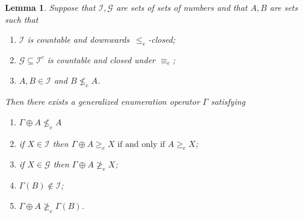 \documentclass[10pt,a4paper]{amsart}
\newtheorem{lemma}{Lemma}
\begin{document}
\begin{lemma}\label{lem:a-splitting}
Suppose that $\mathcal{I},\mathcal{G}$ are sets of sets of numbers and 
that $A, B$ are sets such that 

\begin{enumerate}
  \item[(a)] $\mathcal{I}$ is countable and downwards~$\leq_e$-closed;
  \item[(b)] $\mathcal{G} \subseteq \mathcal{I}^c$ is countable and closed 
      under $\equiv_e$; 
  \item[(c)] $A, B \in \mathcal{I}$ and $B \nleq_e A$. 
\end{enumerate} 

Then there exists a generalized enumeration operator $\Gamma$ satisfying 

\begin{enumerate}
  \item[(0)] $\Gamma \oplus A \nleq_e A$
  \item if $X \in \mathcal{I}$ then $\Gamma \oplus A\geq_e X \textrm{ if 
      and only if } A \geq_e X$; 
  \item if $X \in \mathcal{G}$ then $\Gamma \oplus A \ngeq_e X$; 
  \item $\Gamma(B) \notin \mathcal{I}$;
  \item $\Gamma\oplus A \ngeq_e \Gamma(B)$.
\end{enumerate}
\end{lemma}
\end{document}
